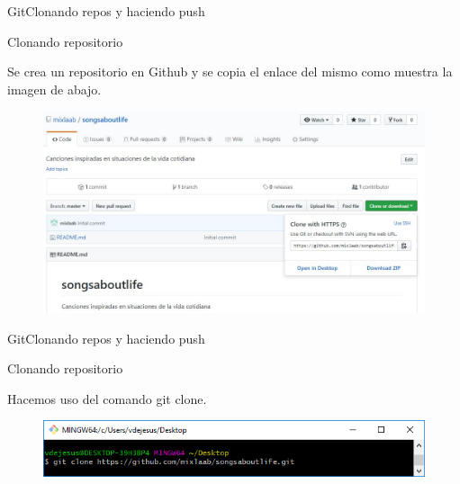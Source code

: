 \documentclass[10pt]{beamer}
\begin{document}
\begin{frame}{Git}{Clonando repos y haciendo push}

\begin{block}{Clonando repositorio}

Se crea un repositorio en Github y se copia el enlace del mismo como muestra la imagen de abajo.

\begin{figure}[h!]
\centering
\includegraphics [scale=0.35]{songsaboutlife}
\label{fig:songs}
\end{figure}

\end{block}

\end{frame}

\begin{frame}{Git}{Clonando repos y haciendo push}

\begin{block}{Clonando repositorio}

Hacemos uso del comando git clone.

\begin{figure}[h!]
\centering
\includegraphics [scale=0.5]{gitclone}
\label{fig:gitclone}
\end{figure}

\end{block}

\end{frame}
\end{document}
